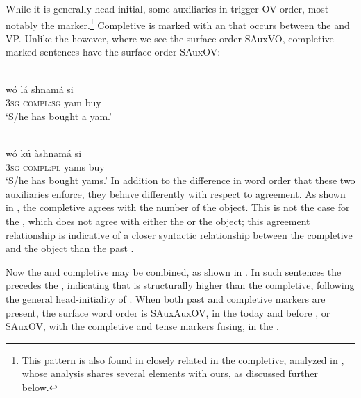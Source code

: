 \documentclass[output=paper,newtxmath,modfonts,nonflat,draftmode]{langsci/langscibook}
\begin{document}
While it is generally head-initial, some auxiliaries in  trigger OV order, most notably the  marker.\footnote{This pattern is also found in closely related  in the completive, analyzed in \citet{kandy03}, whose analysis shares several elements with ours, as discussed further below.} Completive  is marked with an  that occurs between the  and VP. Unlike the  however, where we see the surface order SAuxVO, completive-marked sentences have the surface order SAuxOV:

\ea \label{ex:13:gwari}
	\\
\gll wó lá shnamá si \\
3\textsc{sg} \textsc{compl:sg} yam buy \\
\glt `S/he has bought a yam.' \hfill \citep[][64]{hyman1970}

	\\
\gll wó  kú àshnamá si \\
3\textsc{sg} \textsc{compl:pl} yams buy \\
\glt `S/he has bought yams.' \hfill \citep[][56]{hyman1970}
\z
\z
In addition to the difference in word order that these two auxiliaries enforce, they behave differently with respect to agreement. As shown in , the completive  agrees with the number of the object. This is not the case for the  , which does not agree with either the  or the object; this agreement relationship is indicative of a closer syntactic relationship between the completive and the object than the past .

Now the   and completive  may be combined, as shown in . In such sentences the  precedes the , indicating that  is structurally higher than the completive, following the general head-initiality of  . When both past and completive markers are present, the surface word order is SAuxAuxOV, in the today and before , or SAuxOV, with the completive and tense markers fusing, in the .
\end{document}
